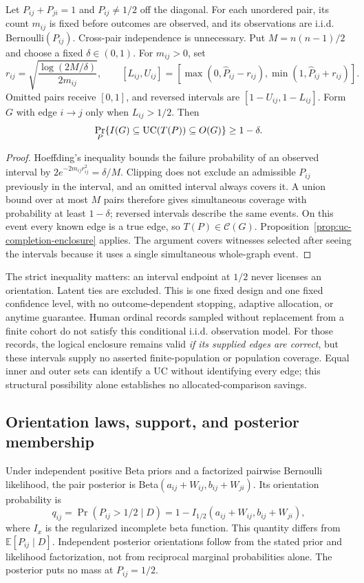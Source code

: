 \begin{corollary}\label{cor:uc-fixed-design-enclosure}
Let $P_{ij}+P_{ji}=1$ and $P_{ij}\ne1/2$ off the diagonal. For each unordered pair, its count $m_{ij}$ is fixed before outcomes are observed, and its observations are i.i.d. Bernoulli$(P_{ij})$. Cross-pair independence is unnecessary. Put $M=n(n-1)/2$ and choose a fixed $\delta\in(0,1)$. For $m_{ij}>0$, set
\[
r_{ij}=\sqrt{\frac{\log(2M/\delta)}{2m_{ij}}},\qquad
[L_{ij},U_{ij}]=[\max(0,\widehat P_{ij}-r_{ij}),\min(1,\widehat P_{ij}+r_{ij})].
\]
Omitted pairs receive $[0,1]$, and reversed intervals are $[1-U_{ij},1-L_{ij}]$. Form $G$ with edge $i\to j$ only when $L_{ij}>1/2$. Then
\[
\Pr_P\{I(G)\subseteq\mathrm{UC}(T(P))\subseteq O(G)\}\ge1-\delta.
\]
\end{corollary}
\begin{proof}
Hoeffding's inequality \citep{hoeffding1963probability} bounds the failure probability of an observed interval by $2e^{-2m_{ij}r_{ij}^2}=\delta/M$. Clipping does not exclude an admissible $P_{ij}$ previously in the interval, and an omitted interval always covers it. A union bound over at most $M$ pairs therefore gives simultaneous coverage with probability at least $1-\delta$; reversed intervals describe the same events. On this event every known edge is a true edge, so $T(P)\in\mathcal C(G)$. Proposition~\ref{prop:uc-completion-enclosure} applies. The argument covers witnesses selected after seeing the intervals because it uses a single simultaneous whole-graph event.
\end{proof}
The strict inequality matters: an interval endpoint at $1/2$ never licenses an orientation. Latent ties are excluded. This is one fixed design and one fixed confidence level, with no outcome-dependent stopping, adaptive allocation, or anytime guarantee. Human ordinal records sampled without replacement from a finite cohort do not satisfy this conditional i.i.d. observation model. For those records, the logical enclosure remains valid \emph{if its supplied edges are correct}, but these intervals supply no asserted finite-population or population coverage. Equal inner and outer sets can identify a UC without identifying every edge; this structural possibility alone establishes no allocated-comparison savings.

\subsection{Orientation laws, support, and posterior membership}\label{app:posterior-law-support}
Under independent positive Beta priors and a factorized pairwise Bernoulli likelihood, the pair posterior is Beta$(a_{ij}+W_{ij},b_{ij}+W_{ji})$. Its orientation probability is
\[
q_{ij}=\Pr(P_{ij}>1/2\mid D)=1-I_{1/2}(a_{ij}+W_{ij},b_{ij}+W_{ji}),
\]
where $I_x$ is the regularized incomplete beta function. This quantity differs from $\mathbb E[P_{ij}\mid D]$. Independent posterior orientations follow from the stated prior and likelihood factorization, not from reciprocal marginal probabilities alone. The posterior puts no mass at $P_{ij}=1/2$.

